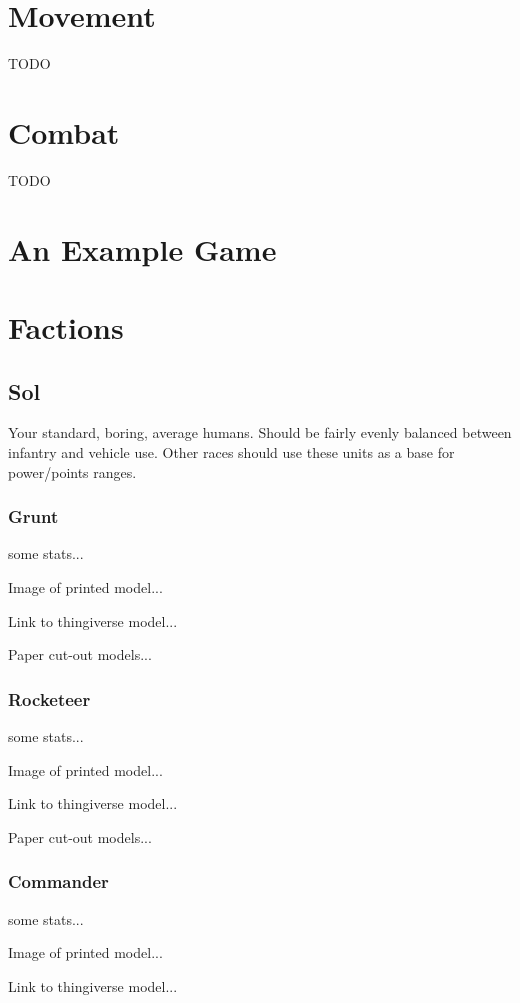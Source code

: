 \documentclass{article}
\begin{document}
\section{Movement}
TODO

\section{Combat}
TODO

\section{An Example Game}

\section{Factions}
\subsection{Sol}
Your standard, boring, average humans. Should be fairly evenly balanced between infantry and vehicle use.  Other races should use these units as a base for power/points ranges.

\subsubsection{Grunt}

some stats...

Image of printed model...

Link to thingiverse model...

Paper cut-out models...

\subsubsection{Rocketeer}

some stats...

Image of printed model...

Link to thingiverse model...

Paper cut-out models...

\subsubsection{Commander}

some stats...

Image of printed model...

Link to thingiverse model...
\end{document}
